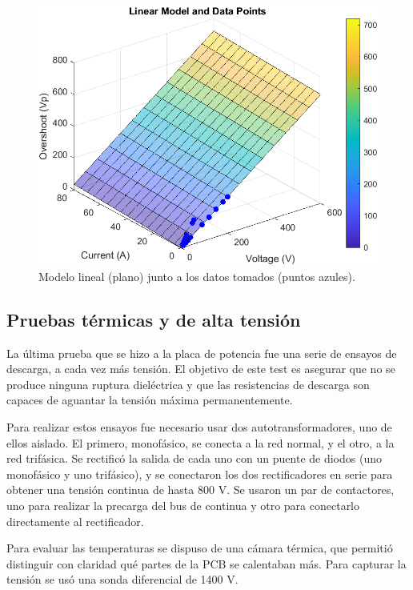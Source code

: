 \begin{figure}[H]
	\centering
	\includegraphics[width=0.7\linewidth]{fig/overshootFinal3}
	\caption{Modelo lineal (plano) junto a los datos tomados (puntos azules).}
\end{figure}


\subsection{Pruebas térmicas y de alta tensión}

La última prueba que se hizo a la placa de potencia fue una serie de ensayos de descarga, a cada vez más tensión. El objetivo de este test es asegurar que no se produce ninguna ruptura dieléctrica y que las resistencias de descarga son capaces de aguantar la tensión máxima permanentemente.

Para realizar estos ensayos fue necesario usar dos autotransformadores, uno de ellos aislado. El primero, monofásico, se conecta a la red normal, y el otro, a la red trifásica. Se rectificó la salida de cada uno con un puente de diodos (uno monofásico y uno trifásico), y se conectaron los dos rectificadores en serie para obtener una tensión continua de hasta 800 V. Se usaron un par de contactores, uno para realizar la precarga del bus de continua y otro para conectarlo directamente al rectificador.

Para evaluar las temperaturas se dispuso de una cámara térmica, que permitió distinguir con claridad qué partes de la PCB se calentaban más. Para capturar la tensión se usó una sonda diferencial de 1400 V.


